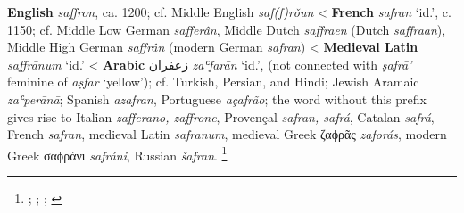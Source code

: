\begin{etymology}\label{ety:saffron}
\textbf{English} \textit{saffron}, ca. 1200; cf. Middle English \textit{saf(f)rǒun}
< \textbf{French} \textit{safran} `id.', c. 1150; cf. Middle Low German \textit{safferân}, Middle Dutch \textit{saffraen} (Dutch \textit{saffraan}), Middle High German \textit{saffrân} (modern German \textit{safran})
< \textbf{Medieval Latin} \textit{saffrānum} `id.'
< \textbf{Arabic} {زعفران} \textit{zaʿfarān} `id.', (not connected with \textit{ṣafrā'} feminine of \textit{aṣfar} `yellow'); cf. Turkish, Persian, and Hindi; Jewish Aramaic \textit{zaʿperānā}; Spanish \textit{azafran}, Portuguese \textit{açafrão}; the word without this prefix gives rise to Italian \textit{zafferano, zaffrone}, Provençal \textit{safran, safrá}, Catalan \textit{safrá}, French \textit{safran}, medieval Latin \textit{safranum}, medieval Greek ζαϕρᾶς \textit{zaforás}, modern Greek σαϕράνι \textit{safráni}, Russian \textit{šafran}. \footnote{\textcite[s.v. saffron]{oed}; \textcite[saf(f)rǒun]{med}; \textcite[s.v. safran]{tlfi}; \textcite{wehr_dictionary_1976}}
\end{etymology}
